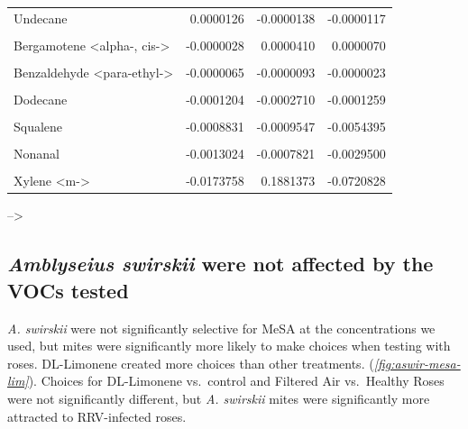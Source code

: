 \documentclass{ufdissertation}[overrideChapters] %
\begin{document}
{\begin{table}
{\begin{tabular}[t]{lrrr}
Undecane & 0.0000126 & -0.0000138 & -0.0000117\\
\cellcolor{gray!6}{Limonene oxide, trans-} & \cellcolor{gray!6}{0.0000065} & \cellcolor{gray!6}{-0.0000065} & \cellcolor{gray!6}{-0.0000158}\\
Bergamotene <alpha-, cis-> & -0.0000028 & 0.0000410 & 0.0000070\\
\addlinespace
\cellcolor{gray!6}{Terpineol <alpha->} & \cellcolor{gray!6}{-0.0000035} & \cellcolor{gray!6}{-0.0000009} & \cellcolor{gray!6}{-0.0000102}\\
Benzaldehyde <para-ethyl-> & -0.0000065 & -0.0000093 & -0.0000023\\
\cellcolor{gray!6}{Hexadecane, 1-bromo-} & \cellcolor{gray!6}{-0.0000287} & \cellcolor{gray!6}{-0.0000616} & \cellcolor{gray!6}{-0.0000215}\\
Dodecane & -0.0001204 & -0.0002710 & -0.0001259\\
\cellcolor{gray!6}{Pentadecane} & \cellcolor{gray!6}{-0.0001940} & \cellcolor{gray!6}{0.0002776} & \cellcolor{gray!6}{0.0002476}\\
\addlinespace
Squalene & -0.0008831 & -0.0009547 & -0.0054395\\
\cellcolor{gray!6}{p-Cymene} & \cellcolor{gray!6}{-0.0012868} & \cellcolor{gray!6}{0.0008397} & \cellcolor{gray!6}{0.0021706}\\
Nonanal & -0.0013024 & -0.0007821 & -0.0029500\\
\cellcolor{gray!6}{Sulindac sulfide} & \cellcolor{gray!6}{-0.0014697} & \cellcolor{gray!6}{0.0011056} & \cellcolor{gray!6}{-0.0001368}\\
Xylene <m-> & -0.0173758 & 0.1881373 & -0.0720828\\
\bottomrule
\end{tabular}}
\end{table}
--\textgreater{}

\hypertarget{amblyseius-swirskii-were-not-affected-by-the-vocs-tested}{%
\subsection{\texorpdfstring{\emph{Amblyseius swirskii} were not affected by the VOCs tested}{Amblyseius swirskii were not affected by the VOCs tested}}\label{amblyseius-swirskii-were-not-affected-by-the-vocs-tested}}

\emph{A. swirskii} were not significantly selective for MeSA at the concentrations we used, but mites were significantly more likely to make choices when testing with roses. DL-Limonene created more choices than other treatments. (\emph{\ref{fig:aswir-mesa-lim}}). Choices for DL-Limonene vs.~control and Filtered Air vs.~Healthy Roses were not significantly different, but \emph{A. swirskii} mites were significantly more attracted to RRV-infected roses.
\begin{figure}


\end{figure}}
\end{document}
